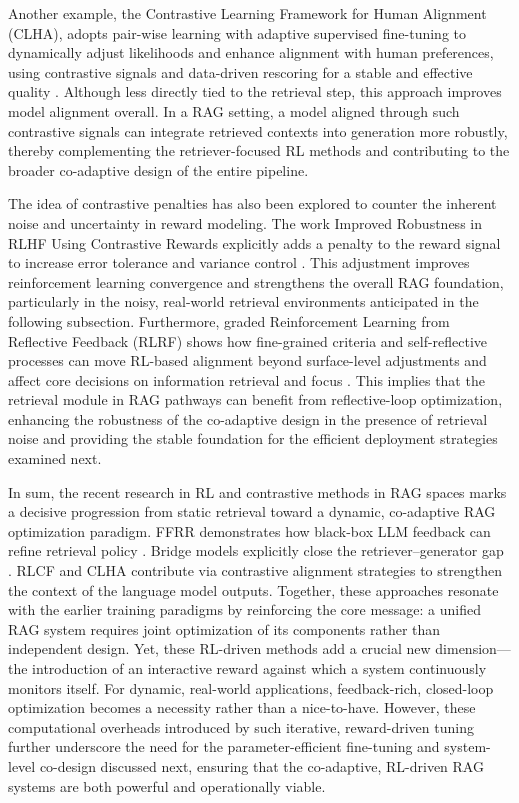 \documentclass[11pt]{article}
\begin{document}
Another example, the Contrastive Learning Framework for Human Alignment (CLHA), adopts pair-wise learning with adaptive supervised fine-tuning to dynamically adjust likelihoods and enhance alignment with human preferences, using contrastive signals and data-driven rescoring for a stable and effective quality \cite{ref83}. Although less directly tied to the retrieval step, this approach improves model alignment overall. In a RAG setting, a model aligned through such contrastive signals can integrate retrieved contexts into generation more robustly, thereby complementing the retriever-focused RL methods and contributing to the broader co-adaptive design of the entire pipeline.

The idea of contrastive penalties has also been explored to counter the inherent noise and uncertainty in reward modeling. The work Improved Robustness in RLHF Using Contrastive Rewards explicitly adds a penalty to the reward signal to increase error tolerance and variance control \cite{ref84}. This adjustment improves reinforcement learning convergence and strengthens the overall RAG foundation, particularly in the noisy, real-world retrieval environments anticipated in the following subsection. Furthermore, graded Reinforcement Learning from Reflective Feedback (RLRF) shows how fine-grained criteria and self-reflective processes can move RL-based alignment beyond surface-level adjustments and affect core decisions on information retrieval and focus \cite{ref85}. This implies that the retrieval module in RAG pathways can benefit from reflective-loop optimization, enhancing the robustness of the co-adaptive design in the presence of retrieval noise and providing the stable foundation for the efficient deployment strategies examined next.

In sum, the recent research in RL and contrastive methods in RAG spaces marks a decisive progression from static retrieval toward a dynamic, co-adaptive RAG optimization paradigm. FFRR demonstrates how black-box LLM feedback can refine retrieval policy \cite{ref79}. Bridge models explicitly close the retriever--generator gap \cite{ref80}. RLCF and CLHA contribute via contrastive alignment strategies to strengthen the context of the language model outputs. Together, these approaches resonate with the earlier training paradigms by reinforcing the core message: a unified RAG system requires joint optimization of its components rather than independent design. Yet, these RL-driven methods add a crucial new dimension---the introduction of an interactive reward against which a system continuously monitors itself. For dynamic, real-world applications, feedback-rich, closed-loop optimization becomes a necessity rather than a nice-to-have. However, these computational overheads introduced by such iterative, reward-driven tuning further underscore the need for the parameter-efficient fine-tuning and system-level co-design discussed next, ensuring that the co-adaptive, RL-driven RAG systems are both powerful and operationally viable.
\end{document}
